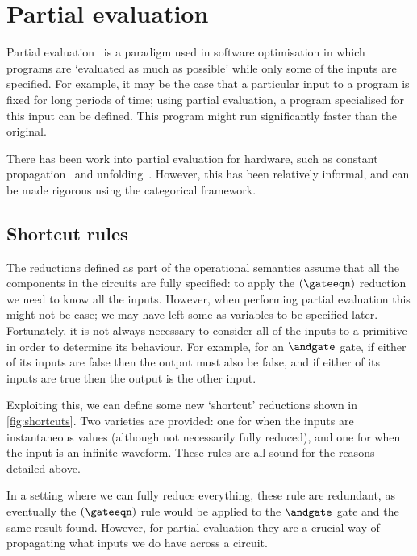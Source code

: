 \section{Partial evaluation}

Partial evaluation~\cite{jones1996introduction} is a paradigm used in software
optimisation in which programs are `evaluated as much as possible' while only
some of the inputs are specified.
For example, it may be the case that a particular input to a program is fixed
for long periods of time; using partial evaluation, a program specialised for
this input can be defined.
This program might run significantly faster than the original.

There has been work into partial evaluation for hardware, such as constant
propagation~\cite{singh1996expressing,singh1999partial} and
unfolding~\cite{thompson2006bitlevel}.
However, this has been relatively informal, and can be made rigorous using the
categorical framework.

\subsection{Shortcut rules}

The reductions defined as part of the operational semantics assume that all the
components in the circuits are fully specified: to apply the \((\gateeqn)\)
reduction we need to know all the inputs.
However, when performing partial evaluation this might not be case; we may have
left some as variables to be specified later.
Fortunately, it is not always necessary to consider all of the inputs to a
primitive in order to determine its behaviour.
For example, for an \(\andgate\) gate, if either of its inputs are false then
the output must also be false, and if either of its inputs are true then the
output is the other input.

Exploiting this, we can define some new `shortcut' reductions shown in
\cref{fig:shortcuts}.
Two varieties are provided: one for when the inputs are instantaneous values
(although not necessarily fully reduced), and one for when the input is an
infinite waveform.
These rules are all sound for the reasons detailed above.

In a setting where we can fully reduce everything, these rule are redundant, as
eventually the \((\gateeqn)\) rule would be applied to the \(\andgate\)
gate and the same result found.
However, for partial evaluation they are a crucial way of propagating what
inputs we do have across a circuit.

